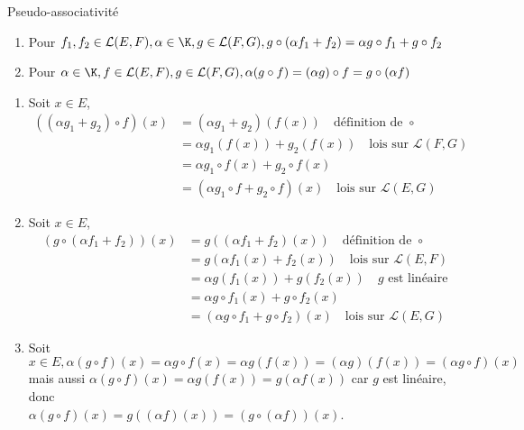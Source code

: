 \documentclass[12pt, a4paper]{report}
\begin{document}
\begin{remarque}{}
\begin{proposition}{Pseudo-associativité}{}
\begin{enumerate}
	\item Pour $f_1,f_2 \in \mathcal{L}(E,F), \alpha \in \K, g \in \mathcal{L}(F,G), g \circ (\alpha f_1+f_2) = \alpha g \circ f_1 + g \circ f_2$
	
	\item Pour $\alpha \in \K, f \in \mathcal{L}(E,F), g \in \mathcal{L}(F,G), \alpha (g \circ f) = (\alpha g) \circ f = g \circ (\alpha f)$
\end{enumerate}
\end{proposition}

\begin{demo}{}
\begin{enumerate}
	\item Soit $x \in E$,
	\begin{align*}
	((\alpha g_1 + g_2) \circ f)(x) &= (\alpha g_1 + g_2)(f(x)) \quad \text{définition de } \circ \\
	&= \alpha g_1 (f(x)) + g_2 (f(x)) \quad \text{lois sur } \mathcal{L}(F,G) \\
	&= \alpha g_1 \circ f(x) + g_2 \circ f(x) \\
	&= (\alpha g_1 \circ f + g_2 \circ f)(x)  \quad \text{lois sur } \mathcal{L}(E,G)
	\end{align*}
	
	\item Soit $x \in E$,
	\begin{align*}
	(g \circ (\alpha f_1 + f_2))(x) &= g((\alpha f_1 + f_2)(x)) \quad \text{définition de } \circ \\
	&= g(\alpha f_1(x) + f_2(x)) \quad \text{lois sur } \mathcal{L}(E,F) \\
	&= \alpha g(f_1(x)) + g(f_2(x)) \quad g \text{ est linéaire} \\
	&= \alpha g \circ f_1(x) + g \circ f_2(x) \\
	&= (\alpha g \circ f_1 + g \circ f_2)(x) \quad \text{lois sur } \mathcal{L}(E,G)
	\end{align*}
	
	\item Soit $x \in E, \alpha (g \circ f)(x) = \alpha g \circ f (x) = \alpha g(f(x)) = (\alpha g)(f(x)) = (\alpha g \circ f)(x)$ \\
	mais aussi $\alpha (g \circ f)(x) = \alpha g(f(x)) = g(\alpha f(x))$ car $g$ est linéaire, donc \\
	$\alpha (g \circ f)(x) = g((\alpha f)(x)) = (g \circ (\alpha f))(x)$.
\end{enumerate}
\end{demo}


\end{remarque}
\end{document}
